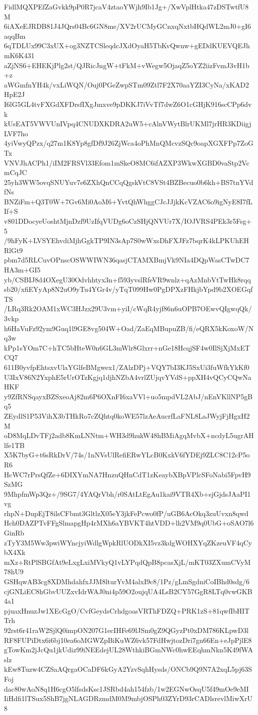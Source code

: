 FidlMQXPEfZaGvkk9pP0R7jcaV4ztaoYWjh9Ib1Jg+/XwVplHtka47zDSTwtfU8M
6iAXeEJRDB81J4JQrs04Bc6GN8me/XV2rUCMyGCnxqNxtbHQdWL2mJ0+gI6aqqBm
6qTDLUx99C3xUX+og3NZTCSleqdcJXdOyaH5TbKvQwnw+gEDdKUEVQEJhmK6K431
aZjNS6+EHEKjPlg2st/QJRicJngW+tFkM+vWegw5OjaqZ5oYZ2iizFvmJ3vH1b+z
aWGmfnYH4k/vxLiWQN/Ouj0PGeZwpSTm09Ztl7F2X70aaYZI3CyNa/xKAD2HpE2J
I6lG5GL4tvFXGdXFDrsfIXgJmxve9pDKKJ7iVvTf7dwZ6O1cGHjK916scCPp6dvk
kUsEAT5VWVUnIVpq4CNUDXKDRA2uW5+cAlnVWytBlrUKMl7jrHR3KDiigjLVF7ho
4yiVwyQPzx/q27m1K8Yp8gfDf9J26ZjWca4oPhMnQMcvzSQc9oapXGXFPp7ZoGTx
VNVJhACPh1/iIM2FRSVl33Efom1mSkeO8MC6ifAZXP3WkwXGBD0vaStp2VcmCqJC
25yh3WW5ovqSNUYuv7e6ZXhQnCCqQgskVtC8VSt4BZBecuo0b6kh+BS7tnYVdfNs
BNZiFm+Q3T0W+7Gv6Mi0AoM6+YvtQhWhggCJcJJjkKcVZAC6o9igNyE8I7fLIf+S
v801DDocyeUoshtMjnDzf9UzIfqVUDg6oCzSHjQNVUr7X/IOJVRS4PEk3r5Fsg+5
/9hFyK+LVSYEhvdiMjhGgkTP9IN3sAp7S0wWxsDhFXJFz7bqrK4kLPKUhEHRlGt9
pbm7d5RLCuvOPnscOSWWIWN36qasjCTAMXBmjVk9NIa4DQpWasCTwDC7HA3m+GI5
yb/CSBIJ8d4OXegU30Odvhhtyx3n+f593yvslRfeVR9wnlz+qAzMnbVtTwHk8rqq
sb20/xfiEYyAp8N2uO9yTu4YGr4v/yTqT099Hw0PgDPXzFHkjbYpd9b2XOEGqfTS
/LRq3Rk2OAM1xWC3HJzx29U3vm+yiI/cWqR4yjf86n6uOPB7OEwvQIgwqQk/3vkp
h6HaVuFz92ym9Guq1l9GE8vg504W+Oad/ZaEqMBupuZB/fi/eQRX5kKoxoW/Nq3w
kPp1sYOm7C+hTC5bHteW0n6GL3mWlr8Glxrr+nGe18HcqjSF4w0IlSjXjMxETCQ7
611B0yvfpEhtsxvUlaYGlfeBMgwex1/ZAlzDPj+VQY7bI3KJ5SxUi3fuWfkYkKf0
U3IxV86N2YxphE5rUrOTzKgjq1djhNZbA4vrlZUjqvYVdS+ppXH4vQCyCQwNaHKF
y9ZfRNSqayxBZSxeoAj82m6P6OXnFI6xaVVl+uo5mpdVL2AbJ/nEnVKllNP5gBq5
ZEydlS1P53VihX3bTHkRo7cZQhtq0koWE57lzAeAucrfLaFNL8LaJWyjFjHgxH2M
oD8MqLDvTFj2adb8KmLNNtm+WH3d9hukW48hBMiAgqMvbX+ncdyL5ugrAHlfe1TB
X5K7byG+t6sRkDrV/74s/1nNVsUlRefiERwYLcB0KxkV6fYDEj9ZLC8C12cP5oR6
HcWC7rPrsQfZe+6DIXYmNA7HnzuQHnCdT1zKeaybXBpVPlcSFoNabi5FpvH9SzMG
9MhpfmWp3Qz+/9SG7/4YAQrVbh/r0SAtLtEgAu1kai9VTR4Xb+sjGjdsJAaPI1vg
rhpN+DupEjT8ilsCFbmt3GltlzX05eY3jkFePcwo0fP/uGB6AcOkq3zuUvxn8qwd
Hch0DAZPTvFFgSlmapgHp4rMXh6aYBVKT4htVDD+lh2VM9q0UbG+oSAO7l6GinRb
zTyY3M5Ww3pwiWYncjyiWdlgWpkRlUODkXI5vz3kdgWOHXYqZKzeuVF4qCybX4Xk
mXz+RtPlSBGfAt9eLxgLxiMVkyQ1vLYPqdQpB8pcasXjL/mKT03ZXumCVyM78hU9
GSHqwAB3cg8XDMhdahfxJJM8lturYvM4alxI9c8/1Pz/gLmSgdniCoIBhd0sdg/6
cjGNLiEC8hGbvUUZxvIdrWAJ0ni4p59O2oujqUA4LsB2CY57GgR8LTq0vwGKB4a1
pjuaxHnuzJw1XEcGgO/CvfGeydsCrhdgoasVRThFDZQ+PRK1zS+81qwfIbHITTrh
92rst6r41raW2SjlQ0impON207G1ecIHFe69lJSm0gZ9QGyzPt0xDM786KLpwD3l
RF8FUPiDtx6i6bj10ea6oMGWZpBiKuWZ6vk57FdHwjtozDri7gn66En+eJpPjlE8
gTowKm2jJcQu1jkUdiz99iNEEdejUL28WthkiBGmNWc0hwEEqhmNkn5K49fWAslz
kEw8Tuzw4CZSaAQrgaOCaDF6kGyA2YzvSqhHysds/ONCb9Q9N7A2xqL5pj63SFoj
dac80wAoN8q1H6cgO5lfsdsKsc1JSRbd4ah154fzb/1w2EGNwOsqU5f49mOe9eMI
IiHdfi1lTSux5ShB7jgNLAGDRzmdM0M9mbjOSPh03ZYrD93rCADlsrevlMiwXrU8
